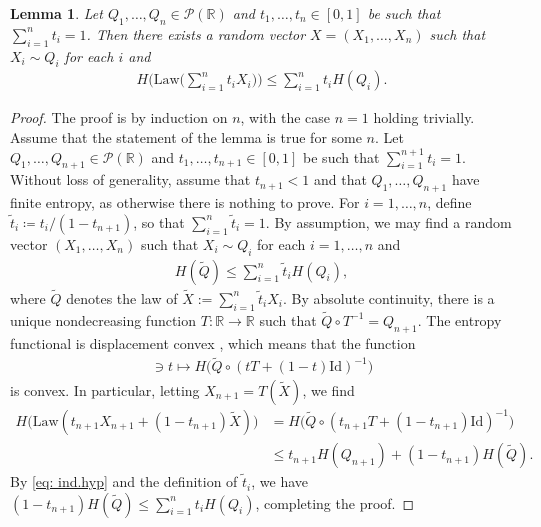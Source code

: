 \documentclass[11pt,reqno]{amsart}
\numberwithin{equation}{section}
\newtheorem{lemma}[theorem]{Lemma}
\theoremstyle{definition}
\def\R{{\mathbb R}}
\def\P{{\mathcal P}}
\begin{document}
\begin{lemma} \label{lem: entropy.convexity}
	Let $ Q_1, \dots, Q_n \in \P(\R)$ and $t_1, \dots, t_n \in [0, 1]$  be such that $\sum_{i=1}^n t_i = 1$. Then there exists a random vector $X = (X_1, \dots, X_n)$ such that $X_i \sim Q_i$ for each $i$ and 
	\begin{align*}
		H\bigg( \mathrm{Law} \bigg( \sum_{i=1}^n t_i X_i\bigg)\bigg) \le  \sum_{i=1}^n t_i H( Q_i).
	\end{align*}
\end{lemma}
\begin{proof}
	The proof is by induction on $n$, with the case $n=1$ holding trivially.
	Assume that the statement of the lemma is true for some $n$. Let $ Q_1, \dots, Q_{n+1} \in \P(\R)$ and $t_1, \dots, t_{n+1} \in [0, 1]$  be such that $\sum_{i=1}^{n+1} t_i = 1$. 
	Without loss of generality, assume that $t_{n+1} < 1$ and that $ Q_1, \dots, Q_{n+1}$ have finite entropy, as otherwise there is nothing to prove. 
	For $i=1,\dots, n$, define $\tilde{t}_i \coloneqq t_i / (1 - t_{n+1})$, so that $\sum_{i=1}^{n} \tilde{t}_i = 1$.  By assumption, we may find a random vector $( X_1, \dots, X_n)$ such that $X_i \sim Q_i$ for each $i=1,\ldots,n$ and 
	\begin{align} \label{eq: ind.hyp}
		H(\widetilde{Q}) \le  \sum_{i=1}^{n} \tilde{t}_i H(Q_i),
	\end{align}
	where  $\widetilde{Q}$ denotes the law of $\widetilde{X} :=  \sum_{i=1}^{n} \tilde{t}_i X_i$. By absolute continuity, there is a unique nondecreasing function $T : \R \to \R$ such that $\widetilde{Q} \circ T^{-1} = Q_{n+1}$. 
	The entropy functional is displacement convex \cite[Theorem 5.15(i)]{villani2003topics}, which means that the function 
	\begin{align*}
		[0,1] \ni t \mapsto H\big(\widetilde{Q} \circ (tT + (1-t)\mathrm{Id})^{-1}\big)
	\end{align*}
	is convex. In particular, letting $X_{n+1}=T(\widetilde{X})$, we find
	\begin{align*}
		H\big(\mathrm{Law}(t_{n+1}X_{n+1} + (1-t_{n+1})\widetilde{X})\big) &= H\big(\widetilde{Q} \circ (t_{n+1}T + (1-t_{n+1})\mathrm{Id})^{-1}\big) \\
		&\le t_{n+1}H(Q_{n+1}) + (1-t_{n+1})H(\widetilde{Q}).
	\end{align*}
	By \eqref{eq: ind.hyp} and the definition of $\tilde{t}_i$, we have $(1-t_{n+1})H(\widetilde{Q}) \le \sum_{i=1}^{n} t_i H(Q_i)$, completing the proof.
\end{proof}  
\end{document}
